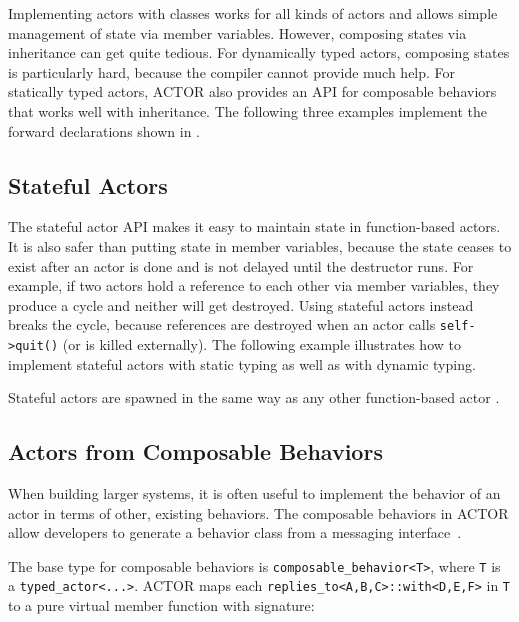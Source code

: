 Implementing actors with classes works for all kinds of actors and allows
simple management of state via member variables. However, composing states via
inheritance can get quite tedious. For dynamically typed actors, composing
states is particularly hard, because the compiler cannot provide much help. For
statically typed actors, ACTOR also provides an API for composable
behaviors~ that works well with inheritance. The
following three examples implement the forward declarations shown in
.


\clearpage
\subsection{Stateful Actors}
\label{stateful-actor}

The stateful actor API makes it easy to maintain state in function-based
actors. It is also safer than putting state in member variables, because the
state ceases to exist after an actor is done and is not delayed until the
destructor runs. For example, if two actors hold a reference to each other via
member variables, they produce a cycle and neither will get destroyed. Using
stateful actors instead breaks the cycle, because references are destroyed when
an actor calls \lstinline^self->quit()^ (or is killed externally). The
following example illustrates how to implement stateful actors with static
typing as well as with dynamic typing.


Stateful actors are spawned in the same way as any other function-based actor
.


\clearpage
\subsection{Actors from Composable Behaviors \experimental}
\label{composable-behavior}

When building larger systems, it is often useful to implement the behavior of
an actor in terms of other, existing behaviors. The composable behaviors in
ACTOR allow developers to generate a behavior class from a messaging
interface~.

The base type for composable behaviors is \lstinline^composable_behavior<T>^,
where \lstinline^T^ is a \lstinline^typed_actor<...>^. ACTOR maps each
\lstinline^replies_to<A,B,C>::with<D,E,F>^ in \lstinline^T^ to a pure virtual
member function with signature:

